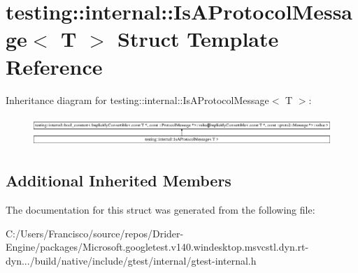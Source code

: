 \hypertarget{structtesting_1_1internal_1_1_is_a_protocol_message}{}\section{testing\+:\+:internal\+:\+:Is\+A\+Protocol\+Message$<$ T $>$ Struct Template Reference}
\label{structtesting_1_1internal_1_1_is_a_protocol_message}
Inheritance diagram for testing\+:\+:internal\+:\+:Is\+A\+Protocol\+Message$<$ T $>$\+:\begin{figure}[H]
\begin{center}
\leavevmode
\includegraphics[height=1.144024cm]{structtesting_1_1internal_1_1_is_a_protocol_message}
\end{center}
\end{figure}
\subsection*{Additional Inherited Members}


The documentation for this struct was generated from the following file\+:\begin{DoxyCompactItemize}
\item 
C\+:/\+Users/\+Francisco/source/repos/\+Drider-\/\+Engine/packages/\+Microsoft.\+googletest.\+v140.\+windesktop.\+msvcstl.\+dyn.\+rt-\/dyn.../build/native/include/gtest/internal/gtest-\/internal.\+h\end{DoxyCompactItemize}
